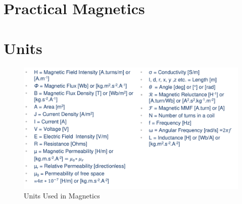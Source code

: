 \documentclass{book}
\begin{document}
\section{Practical Magnetics}

\section{Units}

\begin{figure}
	\centering
	\includegraphics[width=0.7\linewidth]{Screenshots/magnetics_units}
	\caption{Units Used in Magnetics}
	\label{fig:magneticsunits}
\end{figure}
\end{document}
